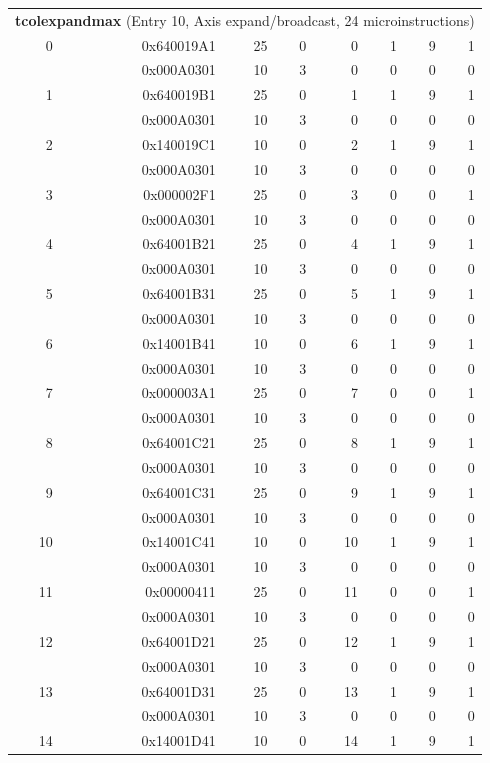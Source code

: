 \begin{longtable}{r r r r r r r r}
\multicolumn{8}{l}{\textbf{tcolexpandmax} (Entry 10, Axis expand/broadcast, 24 microinstructions)} \\
0 & 0x640019A1 & 25 & 0 & 0 & 1 & 9 & 1 \\
  & 0x000A0301 & 10 & 3 & 0 & 0 & 0 & 0 \\
1 & 0x640019B1 & 25 & 0 & 1 & 1 & 9 & 1 \\
  & 0x000A0301 & 10 & 3 & 0 & 0 & 0 & 0 \\
2 & 0x140019C1 & 10 & 0 & 2 & 1 & 9 & 1 \\
  & 0x000A0301 & 10 & 3 & 0 & 0 & 0 & 0 \\
3 & 0x000002F1 & 25 & 0 & 3 & 0 & 0 & 1 \\
  & 0x000A0301 & 10 & 3 & 0 & 0 & 0 & 0 \\
4 & 0x64001B21 & 25 & 0 & 4 & 1 & 9 & 1 \\
  & 0x000A0301 & 10 & 3 & 0 & 0 & 0 & 0 \\
5 & 0x64001B31 & 25 & 0 & 5 & 1 & 9 & 1 \\
  & 0x000A0301 & 10 & 3 & 0 & 0 & 0 & 0 \\
6 & 0x14001B41 & 10 & 0 & 6 & 1 & 9 & 1 \\
  & 0x000A0301 & 10 & 3 & 0 & 0 & 0 & 0 \\
7 & 0x000003A1 & 25 & 0 & 7 & 0 & 0 & 1 \\
  & 0x000A0301 & 10 & 3 & 0 & 0 & 0 & 0 \\
8 & 0x64001C21 & 25 & 0 & 8 & 1 & 9 & 1 \\
  & 0x000A0301 & 10 & 3 & 0 & 0 & 0 & 0 \\
9 & 0x64001C31 & 25 & 0 & 9 & 1 & 9 & 1 \\
  & 0x000A0301 & 10 & 3 & 0 & 0 & 0 & 0 \\
10 & 0x14001C41 & 10 & 0 & 10 & 1 & 9 & 1 \\
  & 0x000A0301 & 10 & 3 & 0 & 0 & 0 & 0 \\
11 & 0x00000411 & 25 & 0 & 11 & 0 & 0 & 1 \\
  & 0x000A0301 & 10 & 3 & 0 & 0 & 0 & 0 \\
12 & 0x64001D21 & 25 & 0 & 12 & 1 & 9 & 1 \\
  & 0x000A0301 & 10 & 3 & 0 & 0 & 0 & 0 \\
13 & 0x64001D31 & 25 & 0 & 13 & 1 & 9 & 1 \\
  & 0x000A0301 & 10 & 3 & 0 & 0 & 0 & 0 \\
14 & 0x14001D41 & 10 & 0 & 14 & 1 & 9 & 1 \\

\end{longtable}
